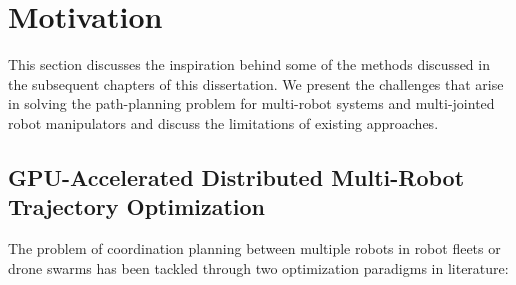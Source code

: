 \section{Motivation}

This section discusses the inspiration behind some of the methods discussed in the subsequent chapters of this dissertation. We present the challenges that arise in solving the path-planning problem for multi-robot systems and multi-jointed robot manipulators and discuss the limitations of existing approaches.

\subsection{GPU-Accelerated Distributed Multi-Robot Trajectory Optimization}

The problem of coordination planning between multiple robots in robot fleets or drone swarms has been tackled through two optimization paradigms in literature:

